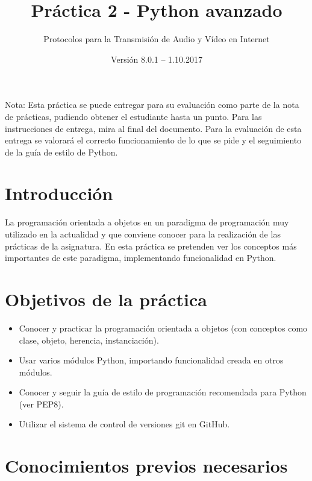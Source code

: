 \documentclass[11pt,a4paper]{article}
\begin{document}
\title{Práctica 2 - Python avanzado}
\author{Protocolos para la Transmisión de Audio y Vídeo en Internet}
\date{Versión 8.0.1 – 1.10.2017}


\maketitle


Nota: Esta práctica se puede entregar para su evaluación como parte de la nota de prácticas, pudiendo obtener el estudiante hasta un punto. Para las instrucciones de entrega, mira al final del documento. Para la evaluación de esta entrega se valorará el correcto funcionamiento de lo que se pide y el seguimiento de la guía de estilo de Python.

\section{Introducción}

La programación orientada a objetos en un paradigma de programación muy utilizado en la actualidad y que conviene conocer para la realización de las prácticas de la asignatura. En esta práctica se pretenden ver los conceptos más importantes de este paradigma, implementando funcionalidad en Python.


\section{Objetivos de la práctica}

\begin{itemize}
  \item Conocer y practicar la programación orientada a objetos (con conceptos como clase, objeto, herencia, instanciación).
  \item Usar varios módulos Python, importando funcionalidad creada en otros módulos.
  \item Conocer y seguir la guía de estilo de programación recomendada para Python (ver PEP8).
  \item Utilizar el sistema de control de versiones git en GitHub.
\end{itemize}

\section{Conocimientos previos necesarios}
\end{document}

